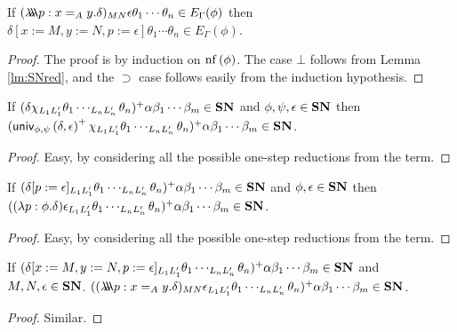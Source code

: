 \begin{lemma}
\label{lm:Ered}
If $(\lambda \!\! \lambda \!\! \lambda p:x =_A y. \delta)_{M N} \epsilon \theta_1 \cdots \theta_n \in E_\Gamma(\phi)$
then $\delta[x:=M, y:=N, p:=\epsilon] \theta_1 \cdots \theta_n \in E_\Gamma(\phi)$.
\end{lemma}

\begin{proof}
The proof is by induction on $\mathrm{nf} \left( {\phi} \right)$.  The case $\bot$ follows from
Lemma \ref{lm:SNred}, and the $\supset$ case follows easily from the induction hypothesis.
\end{proof}

\begin{lemma}
\label{lm:wte_loi1}
If $(\delta \chi_{L_1 L_1'} \theta_1 \cdots_{L_n L_n'} \theta_n)^+ \alpha \beta_1 \cdots \beta_m \in \mathbf{SN}$ and $\phi, \psi, \epsilon \in \mathbf{SN}$ then 
$(\mathsf{univ}_{{\phi} , {\psi}} \left( {\delta} , {\epsilon} \right)^+ \chi_{L_1 L_1'} \theta_1 \cdots_{L_n L_n'} \theta_n)^+ \alpha \beta_1 \cdots \beta_m \in \mathbf{SN}$.
\end{lemma}

\begin{proof}
Easy, by considering all the possible one-step reductions from the term.
\end{proof}

\begin{lemma}
\label{lm:wte_loi2}
If $(\delta[p:=\epsilon]_{L_1 L_1'} \theta_1 \cdots_{L_n L_n'} \theta_n)^+ \alpha \beta_1 \cdots \beta_m \in \mathbf{SN}$ and $\phi, \epsilon \in \mathbf{SN}$ then $((\lambda p : \phi . \delta) \epsilon_{L_1 L_1'} \theta_1 \cdots_{L_n L_n'} \theta_n)^+ \alpha \beta_1 \cdots \beta_m \in \mathbf{SN}$.
\end{lemma}

\begin{proof}
Easy, by considering all the possible one-step reductions from the term.
\end{proof}

\begin{lemma}
\label{lm:wte_loi3}
If $(\delta[x := M, y := N, p := \epsilon]_{L_1 L_1'} \theta_1 \cdots_{L_n L_n'} \theta_n)^+ \alpha \beta_1 \cdots \beta_m \in \mathbf{SN}$ and $M, N, \epsilon \in \mathbf{SN}$.
$((\lambda \!\! \lambda \!\! \lambda p:x =_A y. \delta)_{MN} \epsilon_{L_1 L_1'} \theta_1 \cdots_{L_n L_n'} \theta_n)^+ \alpha \beta_1 \cdots \beta_m \in \mathbf{SN}$.
\end{lemma}

\begin{proof}
Similar.
\end{proof}

